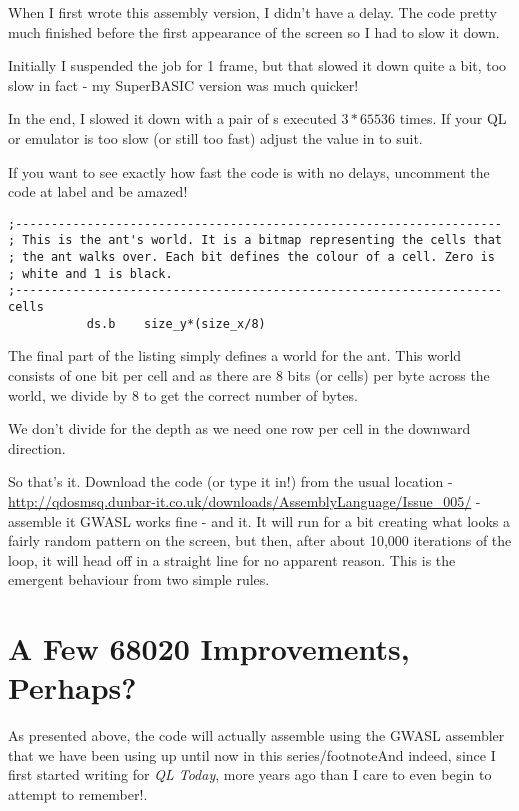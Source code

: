 When I first wrote this assembly version, I didn't have a delay. The code pretty much finished before the first appearance of the screen so I had to slow it down. 

Initially I suspended the job for 1 frame, but that slowed it down quite a bit, too slow in fact - my SuperBASIC version was much quicker! 

In the end, I slowed it down with a pair of s executed $3 * 65536$ times. If your QL or emulator is too slow (or still too fast) adjust the value in  to suit.

If you want to see exactly how fast the code is with no delays, uncomment the code at label  and be amazed!

\begin{lstlisting}[firstnumber=last,caption={Langtons Ant - The Ant's World}]
;--------------------------------------------------------------------
; This is the ant's world. It is a bitmap representing the cells that
; the ant walks over. Each bit defines the colour of a cell. Zero is
; white and 1 is black.
;--------------------------------------------------------------------
cells
           ds.b    size_y*(size_x/8)
\end{lstlisting}

The final part of the listing simply defines a world for the ant. This world consists of one bit per cell and as there are 8 bits (or cells) per byte across the world, we divide by 8 to get the correct number of bytes.

We don't divide for the depth as we need one row per cell in the downward direction.

So that's it. Download the code (or type it in!) from the usual location - \href{http://qdosmsq.dunbar-it.co.uk/downloads/AssemblyLanguage/Issue\_005/}{http://qdosmsq.dunbar-it.co.uk/downloads/AssemblyLanguage/Issue\_005/} - assemble it GWASL works fine - and  it. It will run for a bit creating what looks a fairly random pattern on the screen, but then, after about 10,000 iterations of the  loop, it will head off in a straight line for no apparent reason. This is the emergent behaviour from two simple rules.


\section{A Few 68020 Improvements, Perhaps?}

As presented above, the code will actually assemble using the GWASL assembler that we have been using up until now in this series/footnote{And indeed, since I first started writing for \emph{QL Today}, more years ago than I care to even begin to attempt to remember!}.

